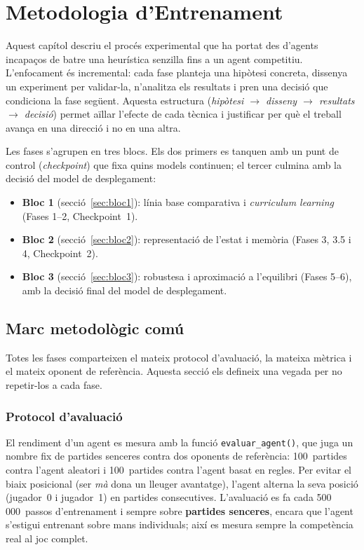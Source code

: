 ﻿%

\chapter{Metodologia d'Entrenament}
\label{cap:metodologia}

Aquest capítol descriu el procés experimental que ha portat des d'agents incapaços de
batre una heurística senzilla fins a un agent competitiu. L'enfocament és incremental:
cada fase planteja una hipòtesi concreta, dissenya un experiment per validar-la,
n'analitza els resultats i pren una decisió que condiciona la fase següent. Aquesta
estructura (\emph{hipòtesi $\rightarrow$ disseny $\rightarrow$ resultats $\rightarrow$
decisió}) permet aïllar l'efecte de cada tècnica i justificar per què el treball avança
en una direcció i no en una altra.

Les fases s'agrupen en tres blocs. Els dos primers es tanquen amb un punt de control
(\emph{checkpoint}) que fixa quins models continuen; el tercer culmina amb la decisió
del model de desplegament:

\begin{itemize}
  \item \textbf{Bloc 1} (secció~\ref{sec:bloc1}): línia base comparativa i
        \emph{curriculum learning} (Fases 1--2, Checkpoint~1).
  \item \textbf{Bloc 2} (secció~\ref{sec:bloc2}): representació de l'estat i memòria
        (Fases 3, 3.5 i 4, Checkpoint~2).
  \item \textbf{Bloc 3} (secció~\ref{sec:bloc3}): robustesa i aproximació a l'equilibri
        (Fases 5--6), amb la decisió final del model de desplegament.
\end{itemize}

\section{Marc metodològic comú}
\label{sec:marc-metodologic}

Totes les fases comparteixen el mateix protocol d'avaluació, la mateixa mètrica i el
mateix oponent de referència. Aquesta secció els defineix una vegada per no repetir-los
a cada fase.

\subsection*{Protocol d'avaluació}

El rendiment d'un agent es mesura amb la funció \texttt{evaluar\_agent()}, que juga un
nombre fix de partides senceres contra dos oponents de referència: 100~partides contra
l'agent aleatori i 100~partides contra l'agent basat en regles. Per evitar el biaix
posicional (ser \emph{mà} dona un lleuger
avantatge), l'agent alterna la seva posició (jugador~0 i jugador~1) en partides
consecutives. L'avaluació es fa cada 500\,000~passos d'entrenament i sempre sobre
\textbf{partides senceres}, encara que l'agent s'estigui entrenant sobre mans
individuals; així es mesura sempre la competència real al joc complet.

